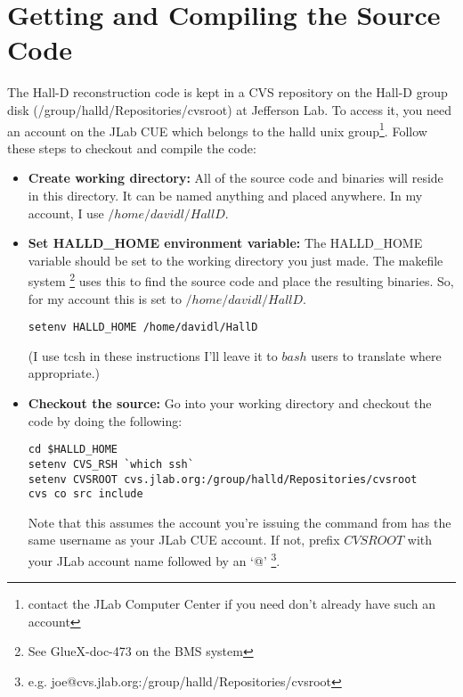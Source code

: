 \documentclass[12pt]{article}
\begin{document}
\section{Getting and Compiling the Source Code}
The Hall-D reconstruction code is kept in a CVS repository on the 
Hall-D group disk (/group/halld/Repositories/cvsroot) at Jefferson Lab.
To access it,
you need an account on the JLab CUE which belongs to the halld unix
group\footnote{contact the JLab Computer Center if you need don't
already have such an account}. Follow these steps to checkout and compile
the code:

\begin{itemize}
	\item{\bf Create working directory:} All of the source code and binaries
	will reside in this directory. It can be named anything and placed 
	anywhere. In my account, I use $/home/davidl/HallD$.
	
	\item{\bf Set HALLD\_HOME environment variable:} The HALLD\_HOME
	variable should
	be set to the working directory you just made. The makefile system
	\footnote{See GlueX-doc-473 on the BMS system}
	uses this to find the source code and place the resulting binaries.
	So, for my account this is set to $/home/davidl/HallD$.
	
		\begin{lstlisting}[frame=shadowbox,backgroundcolor=\color{cmdbkgd}]
setenv HALLD_HOME /home/davidl/HallD
		\end{lstlisting}

	(I use tcsh in these instructions I'll leave it to $bash$ users to translate
	where appropriate.)

	\item{\bf Checkout the source:} Go into
	your working directory and checkout the code by doing the following:
	
		\begin{lstlisting}[frame=shadowbox,backgroundcolor=\color{cmdbkgd}]
cd $HALLD_HOME
setenv CVS_RSH `which ssh`
setenv CVSROOT cvs.jlab.org:/group/halld/Repositories/cvsroot
cvs co src include
		\end{lstlisting}

	Note that this assumes the account you're issuing the command from
	has the same username as your JLab CUE account. If not, prefix
	$CVSROOT$ with your JLab account name followed by an `@'
	\footnote{e.g. joe@cvs.jlab.org:/group/halld/Repositories/cvsroot}.


\end{itemize}
\end{document}
